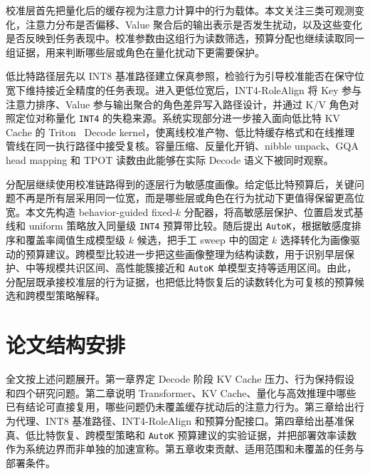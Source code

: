 校准层首先把量化后的缓存视为注意力计算中的行为载体。本文关注三类可观测变化，注意力分布是否偏移、Value 聚合后的输出表示是否发生扰动，以及这些变化是否反映到任务表现中。校准参数由这组行为读数筛选，预算分配也继续读取同一组证据，用来判断哪些层或角色在量化扰动下更需要保护。

低比特路径层先以 INT8 基准路径建立保真参照，检验行为引导校准能否在保守位宽下维持接近全精度的任务表现。进入更低位宽后，\mbox{INT4-RoleAlign} 将 Key 参与注意力排序、Value 参与输出聚合的角色差异写入路径设计，并通过 K/V 角色对照定位对称量化 \texttt{INT4} 的失稳来源。系统实现部分进一步接入面向低比特 KV Cache 的 Triton~\cite{tillet2019triton} Decode kernel，使离线校准产物、低比特缓存格式和在线推理管线在同一执行路径中接受复核。容量压缩、反量化开销、nibble unpack、GQA head mapping 和 TPOT 读数由此能够在实际 Decode 语义下被同时观察。

分配层继续使用校准链路得到的逐层行为敏感度画像。给定低比特预算后，关键问题不再是所有层采用同一位宽，而是哪些层或角色在行为扰动下更值得保留更高位宽。本文先构造 behavior-guided fixed-$k$ 分配器，将高敏感层保护、位置启发式基线和 uniform 策略放入同量级 \texttt{INT4} 预算带比较。随后提出 \texttt{AutoK}，根据敏感度排序和覆盖率阈值生成模型级 $k$ 候选，把手工 sweep 中的固定 $k$ 选择转化为画像驱动的预算建议。跨模型比较进一步把这些画像整理为结构读数，用于识别早层保护、中等规模共识区间、高性能簇接近和 \texttt{AutoK} 单模型支持等适用区间。由此，分配层既承接校准层的行为证据，也把低比特恢复后的读数转化为可复核的预算候选和跨模型策略解释。


\section{论文结构安排}
\label{sec:ch1-structure}

全文按上述问题展开。第一章界定 Decode 阶段 KV Cache 压力、行为保持假设和四个研究问题。第二章说明 Transformer、KV Cache、量化与高效推理中哪些已有结论可直接复用，哪些问题仍未覆盖缓存扰动后的注意力行为。第三章给出行为代理、INT8 基准路径、\mbox{INT4-RoleAlign} 和预算分配接口。第四章给出基准保真、低比特恢复、跨模型策略和 \texttt{AutoK} 预算建议的实验证据，并把部署效率读数作为系统边界而非单独的加速宣称。第五章收束贡献、适用范围和未覆盖的任务与部署条件。
